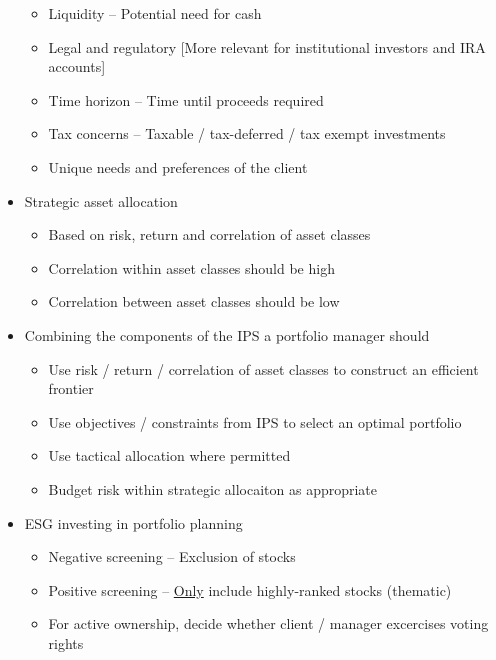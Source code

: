 \documentclass[../notes_compiled.tex]{subfiles}
\begin{document}
\begin{itemize}
\begin{itemize}
\item Liquidity -- Potential need for cash
\item Legal and regulatory [More relevant for institutional investors and IRA accounts]
\item Time horizon -- Time until proceeds required
\item Tax concerns -- Taxable / tax-deferred / tax exempt investments
\item Unique needs and preferences of the client
\end{itemize}
\item Strategic asset allocation
\begin{itemize}
\item Based on risk, return and correlation of asset classes
\item Correlation within asset classes should be high
\item Correlation between asset classes should be low
\end{itemize}
\item Combining the components of the IPS a portfolio manager should
\begin{itemize}
\item Use risk / return / correlation of asset classes to construct an efficient frontier
\item Use objectives / constraints from IPS to select an optimal portfolio
\item Use tactical allocation where permitted
\item Budget risk within strategic allocaiton as appropriate
\end{itemize}
\item ESG investing in portfolio planning
\begin{itemize}
\item Negative screening -- Exclusion of stocks
\item Positive screening -- \underline{Only} include highly-ranked stocks (thematic)
\item For active ownership, decide whether client / manager excercises voting rights
\end{itemize}
\end{itemize}
\end{document}
